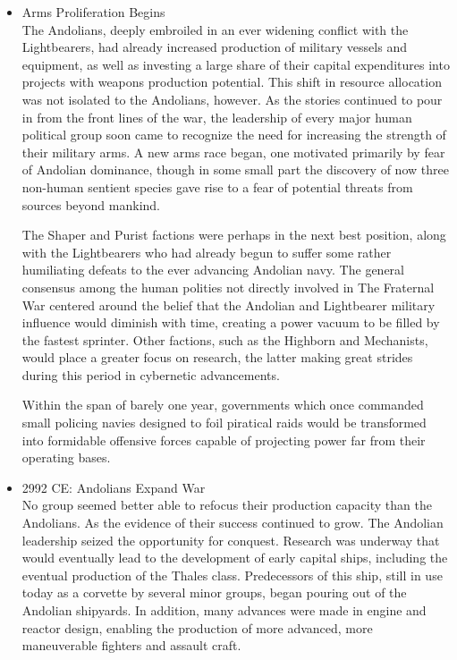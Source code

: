 \begin{itemize}
\item Arms Proliferation Begins \\

The Andolians, deeply embroiled in an ever widening conflict with the
Lightbearers, had already increased production of military vessels and
equipment, as well as investing a large share of their capital
expenditures into projects with weapons production potential.  This
shift in resource allocation was not isolated to the Andolians,
however.  As the stories continued to pour in from the front lines of
the war, the leadership of every major human political group soon came
to recognize the need for increasing the strength of their military
arms.  A new arms race began, one motivated primarily by fear of
Andolian dominance, though in some small part the discovery of now
three non-human sentient species gave rise to a fear of potential
threats from sources beyond mankind.

The Shaper and Purist factions were perhaps in the next best position,
along with the Lightbearers who had already begun to suffer some
rather humiliating defeats to the ever advancing Andolian navy.  The
general consensus among the human polities not directly involved in
The Fraternal War centered around the belief that the Andolian and
Lightbearer military influence would diminish with time, creating a
power vacuum to be filled by the fastest sprinter.  Other factions,
such as the Highborn and Mechanists, would place a greater focus on
research, the latter making great strides during this period in
cybernetic advancements.

Within the span of barely one year, governments which once commanded
small policing navies designed to foil piratical raids would be
transformed into formidable offensive forces capable of projecting
power far from their operating bases.

\item 2992 CE: Andolians Expand War \\

No group seemed better able to refocus their production capacity than
the Andolians.  As the evidence of their success continued to grow.
The Andolian leadership seized the opportunity for conquest.  Research
was underway that would eventually lead to the development of early
capital ships, including the eventual production of the Thales class.
Predecessors of this ship, still in use today as a corvette by several
minor groups, began pouring out of the Andolian shipyards.  In
addition, many advances were made in engine and reactor design,
enabling the production of more advanced, more maneuverable fighters
and assault craft.


\end{itemize}

